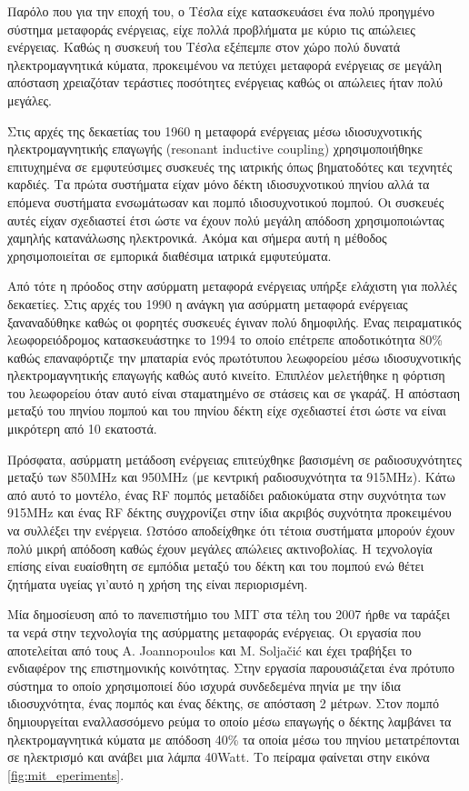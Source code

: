 Παρόλο που για την εποχή του, ο Τέσλα είχε κατασκευάσει ένα πολύ προηγμένο σύστημα μεταφοράς ενέργειας, είχε πολλά προβλήματα με κύριο τις απώλειες ενέργειας. Καθώς
η συσκευή του Τέσλα εξέπεμπε στον χώρο πολύ δυνατά ηλεκτρομαγνητικά κύματα, προκειμένου να πετύχει μεταφορά ενέργειας σε μεγάλη απόσταση χρειαζόταν τεράστιες
ποσότητες ενέργειας καθώς οι απώλειες ήταν πολύ μεγάλες.

Στις αρχές της δεκαετίας του 1960 η μεταφορά ενέργειας μέσω ιδιοσυχνοτικής ηλεκτρομαγνητικής επαγωγής (resonant inductive coupling) χρησιμοποιήθηκε επιτυχημένα σε
εμφυτεύσιμες συσκευές της ιατρικής όπως βηματοδότες και τεχνητές καρδιές. Τα πρώτα συστήματα είχαν μόνο δέκτη ιδιοσυχνοτικού πηνίου αλλά τα επόμενα συστήματα
ενσωμάτωσαν και πομπό ιδιοσυχνοτικού πομπού. Οι συσκευές αυτές είχαν σχεδιαστεί έτσι ώστε να έχουν πολύ μεγάλη απόδοση χρησιμοποιώντας χαμηλής κατανάλωσης
ηλεκτρονικά. Ακόμα και σήμερα αυτή η μέθοδος χρησιμοποιείται σε εμπορικά διαθέσιμα ιατρικά εμφυτεύματα.

Από τότε η πρόοδος στην ασύρματη μεταφορά ενέργειας υπήρξε ελάχιστη για πολλές δεκαετίες. Στις αρχές του 1990 η ανάγκη για ασύρματη μεταφορά ενέργειας
ξαναναδύθηκε καθώς οι φορητές συσκευές έγιναν πολύ δημοφιλής. Ένας πειραματικός λεωφορειόδρομος κατασκευάστηκε το 1994 \cite{bus_coil} το οποίο επέτρεπε
αποδοτικότητα 80\% καθώς επαναφόρτιζε την μπαταρία ενός πρωτότυπου λεωφορείου μέσω ιδιοσυχνοτικής ηλεκτρομαγνητικής επαγωγής καθώς αυτό κινείτο. Επιπλέον μελετήθηκε η
φόρτιση του λεωφορείου όταν αυτό είναι σταματημένο σε στάσεις και σε γκαράζ. Η απόσταση μεταξύ του πηνίου πομπού και του πηνίου δέκτη είχε σχεδιαστεί έτσι ώστε να
είναι μικρότερη από 10 εκατοστά.

Πρόσφατα, ασύρματη μετάδοση ενέργειας επιτεύχθηκε βασισμένη σε ραδιοσυχνότητες μεταξύ των 850MHz και 950MHz (με κεντρική ραδιοσυχνότητα τα 915MHz). Κάτω
από αυτό το μοντέλο, ένας RF πομπός μεταδίδει ραδιοκύματα στην συχνότητα των 915MHz και ένας RF δέκτης συγχρονίζει στην ίδια ακριβός συχνότητα προκειμένου να
συλλέξει την ενέργεια. Ωστόσο αποδείχθηκε ότι τέτοια συστήματα μπορούν έχουν πολύ μικρή απόδοση καθώς έχουν μεγάλες απώλειες ακτινοβολίας. Η τεχνολογία επίσης είναι
ευαίσθητη σε εμπόδια μεταξύ του δέκτη και του πομπού ενώ θέτει ζητήματα υγείας γι'αυτό η χρήση της είναι περιορισμένη.

Μία δημοσίευση από το πανεπιστήμιο του MIT στα τέλη του 2007 ήρθε να ταράξει τα νερά στην τεχνολογία της ασύρματης μεταφοράς ενέργειας. Οι εργασία που αποτελείται
από τους A. Joannopoulos και M. Solja\v{c}i\'{c} και έχει τραβήξει το ενδιαφέρον της επιστημονικής κοινότητας. Στην εργασία παρουσιάζεται ένα πρότυπο σύστημα το
οποίο χρησιμοποιεί δύο ισχυρά συνδεδεμένα πηνία με την ίδια ιδιοσυχνότητα, ένας πομπός και ένας δέκτης, σε απόσταση 2 μέτρων. Στον πομπό δημιουργείται εναλλασσόμενο
ρεύμα το οποίο μέσω επαγωγής ο δέκτης λαμβάνει τα ηλεκτρομαγνητικά κύματα με απόδοση 40\% τα οποία μέσω του πηνίου μετατρέπονται σε ηλεκτρισμό και ανάβει μια λάμπα
40Watt. Το πείραμα φαίνεται στην εικόνα \ref{fig:mit_eperiments}.

